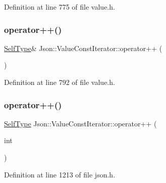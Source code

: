 Definition at line 775 of file value.\+h.

\hypertarget{class_json_1_1_value_const_iterator_a2cfe2f7a94a688186efdafb1b181c319}{}\label{class_json_1_1_value_const_iterator_a2cfe2f7a94a688186efdafb1b181c319} 
\subsubsection{\texorpdfstring{operator++()}{operator++()}\hspace{0.1cm}{\footnotesize\ttfamily [2/4]}}
{\footnotesize\ttfamily \hyperlink{class_json_1_1_value_iterator_base_a9d2a940d03ea06d20d972f41a89149ee}{Self\+Type}\& Json\+::\+Value\+Const\+Iterator\+::operator++ (\begin{DoxyParamCaption}{ }\end{DoxyParamCaption})\hspace{0.3cm}{\ttfamily [inline]}}



Definition at line 792 of file value.\+h.

\hypertarget{class_json_1_1_value_const_iterator_ab3f0c2edbfc8f7d60645f3d597d05e28}{}\label{class_json_1_1_value_const_iterator_ab3f0c2edbfc8f7d60645f3d597d05e28} 
\subsubsection{\texorpdfstring{operator++()}{operator++()}\hspace{0.1cm}{\footnotesize\ttfamily [3/4]}}
{\footnotesize\ttfamily \hyperlink{class_json_1_1_value_iterator_base_a9d2a940d03ea06d20d972f41a89149ee}{Self\+Type} Json\+::\+Value\+Const\+Iterator\+::operator++ (\begin{DoxyParamCaption}\item[{int}]{ }\end{DoxyParamCaption})\hspace{0.3cm}{\ttfamily [inline]}}



Definition at line 1213 of file json.\+h.

\hypertarget{class_json_1_1_value_const_iterator_a2cfe2f7a94a688186efdafb1b181c319}{}\label{class_json_1_1_value_const_iterator_a2cfe2f7a94a688186efdafb1b181c319} 
